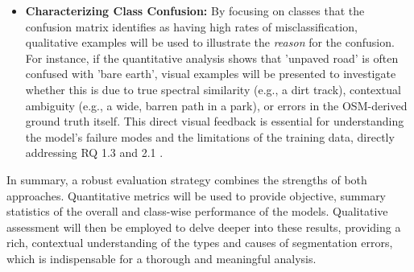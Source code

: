 \documentclass{report}
\begin{document}
\begin{itemize}
\item \textbf{Characterizing Class Confusion:} By focusing on classes that the confusion matrix identifies as having high rates of misclassification, qualitative examples will be used to illustrate the \textit{reason} for the confusion. For instance, if the quantitative analysis shows that 'unpaved road' is often confused with 'bare earth', visual examples will be presented to investigate whether this is due to true spectral similarity (e.g., a dirt track), contextual ambiguity (e.g., a wide, barren path in a park), or errors in the OSM-derived ground truth itself. This direct visual feedback is essential for understanding the model's failure modes and the limitations of the training data, directly addressing RQ 1.3 and 2.1 \parencite[p.~8f., 13.]{SertelEtAlLandUseLandCoverMappingUsingDeepLearningBasedSegmentationApproachesVHRWorldview3Images2022}.
\end{itemize}
In summary, a robust evaluation strategy combines the strengths of both approaches. Quantitative metrics will be used to provide objective, summary statistics of the overall and class-wise performance of the models. Qualitative assessment will then be employed to delve deeper into these results, providing a rich, contextual understanding of the types and causes of segmentation errors, which is indispensable for a thorough and meaningful analysis.
\end{document}

